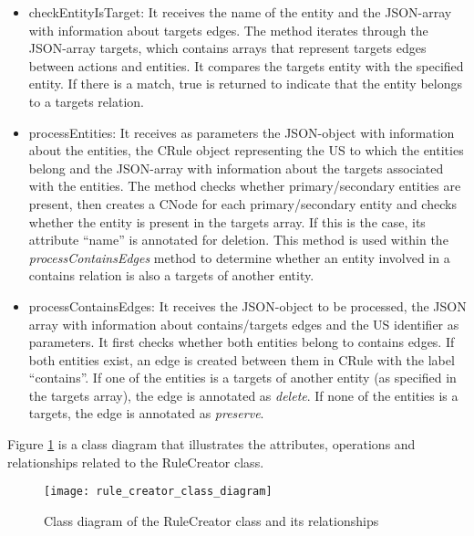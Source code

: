 \begin{itemize}
	\item checkEntityIsTarget: It receives the name of the entity and the JSON-array with information about targets edges. The method iterates through the JSON-array targets, which contains arrays that represent targets edges between actions and entities. It compares the targets entity with the specified entity. If there is a match, true is returned to indicate that the entity belongs to a targets relation.
	
	\item processEntities: It receives as parameters the JSON-object with information about the entities, the CRule object representing the US to which the entities belong and the JSON-array with information about the targets associated with the entities. The method checks whether primary/secondary entities are present, then creates a CNode for each primary/secondary entity and checks whether the entity is present in the targets array. If this is the case, its attribute \enquote{name} is annotated for deletion. This method is used within the \textit{processContainsEdges} method to determine whether an entity involved in a contains relation is also a targets of another entity.
	
	\item processContainsEdges: It receives the JSON-object to be processed, the JSON array with information about contains/targets edges and the US identifier as parameters. It first checks whether both entities belong to contains edges. If both entities exist, an edge is created between them in CRule with the label \enquote{contains}. If one of the entities is a targets of another entity (as specified in the targets array), the edge is annotated as \textit{delete}. If none of the entities is a targets, the edge is annotated as \textit{preserve}.
	
\end{itemize}
Figure \ref{fig:rule_creator_class_diagram} is a class diagram that illustrates the attributes, operations and relationships related to the RuleCreator class.
\begin{figure}[h]
	\centering
	\texttt{[image: rule\_creator\_class\_diagram]}
	\caption{Class diagram of the RuleCreator class and its relationships}\label{fig:rule_creator_class_diagram}
\end{figure}
